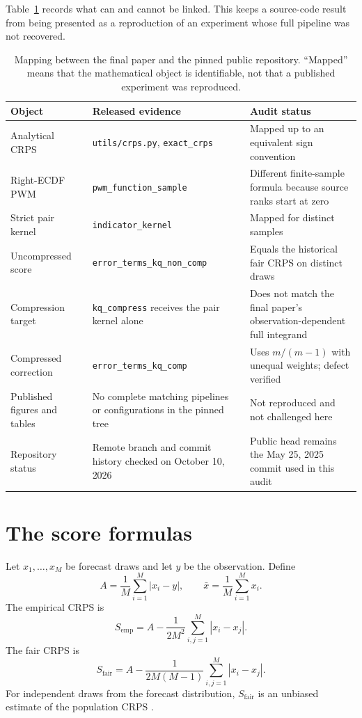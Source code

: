 \documentclass[11pt]{article}
\begin{document}
Table~\ref{tab:mapping} records what can and cannot be linked. This keeps a source-code result from being presented as a reproduction of an experiment whose full pipeline was not recovered.

\begin{table}[htbp]
\centering
\caption{Mapping between the final paper and the pinned public repository. ``Mapped'' means that the mathematical object is identifiable, not that a published experiment was reproduced.}
\label{tab:mapping}
\small
\begin{tabularx}{\textwidth}{>{\raggedright\arraybackslash}p{}>{\raggedright\arraybackslash}p{}X}
\toprule
Object & Released evidence & Audit status \\
\midrule
Analytical CRPS & \texttt{utils/crps.py}, \texttt{exact\_crps} & Mapped up to an equivalent sign convention \\
Right-ECDF PWM & \texttt{pwm\_function\_sample} & Different finite-sample formula because source ranks start at zero \\
Strict pair kernel & \texttt{indicator\_kernel} & Mapped for distinct samples \\
Uncompressed score & \texttt{error\_terms\_kq\_non\_comp} & Equals the historical fair CRPS on distinct draws \\
Compression target & \texttt{kq\_compress} receives the pair kernel alone & Does not match the final paper's observation-dependent full integrand \\
Compressed correction & \texttt{error\_terms\_kq\_comp} & Uses $m/(m-1)$ with unequal weights; defect verified \\
Published figures and tables & No complete matching pipelines or configurations in the pinned tree & Not reproduced and not challenged here \\
Repository status & Remote branch and commit history checked on October 10, 2026 & Public head remains the May 25, 2025 commit used in this audit \\
\bottomrule
\end{tabularx}
\end{table}

\section{The score formulas}

Let $x_1,\ldots,x_M$ be forecast draws and let $y$ be the observation. Define
\[
A=\frac{1}{M}\sum_{i=1}^M |x_i-y|,
\qquad
\bar{x}=\frac{1}{M}\sum_{i=1}^M x_i.
\]
The empirical CRPS is
\[
S_{\mathrm{emp}}=A-\frac{1}{2M^2}\sum_{i,j=1}^M |x_i-x_j|.
\]
The fair CRPS is
\[
S_{\mathrm{fair}}=A-\frac{1}{2M(M-1)}\sum_{i,j=1}^M |x_i-x_j|.
\]
For independent draws from the forecast distribution, $S_{\mathrm{fair}}$ is an unbiased estimate of the population CRPS \cite{ferro,zamo}.
\end{document}
